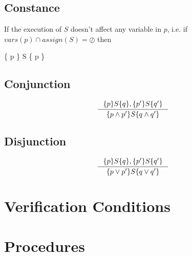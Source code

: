 \documentclass[12pt, a4paper]{book}
\begin{document}
    \subsection{Constance}

    If the execution of $S$ doesn't affect any variable in $p$, i.e.
    if $vars(p) \cap assign(S) = \oslash$ then

    \begin{framed}
        \inference{}
        { \{ p \} S \{ p \}}
    \end{framed}

    \subsection{Conjunction}

    \begin{framed}
        \[
        \inference{ \{ p \} S \{ q \}, \{ p' \} S \{ q' \} }
        { \{ p \land p' \} S \{ q \land q' \} }
        \]
    \end{framed}

    \subsection{Disjunction}

    \begin{framed}
        \[
        \inference{ \{ p \} S \{ q \}, \{ p' \} S \{ q' \} }
        { \{ p \lor p' \} S \{ q \lor q' \} }
        \]
    \end{framed}


  \section{Verification Conditions}
  \label{sec:Verification Conditions}
  \section{Procedures}
  \label{sec:Procedures}

\end{document}
